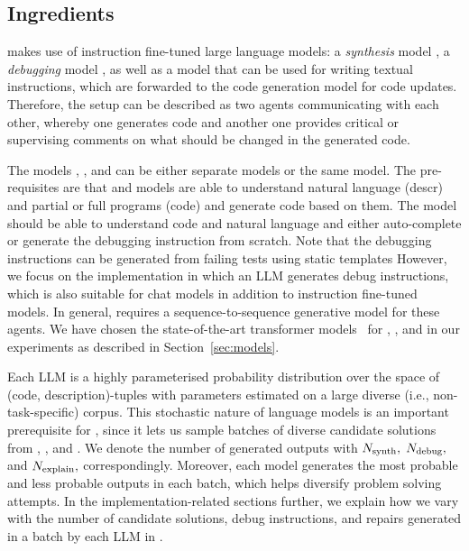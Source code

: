  

\newpage \subsection{Ingredients}
\label{sec:ingredients}

\method{} makes use of instruction fine-tuned large language models: a \emph{synthesis} model \synthmodel{}, a \emph{debugging} model \debugmodel{}, as well as a model \textmodel{} that can be used for writing textual instructions, which are forwarded to the code generation model \debugmodel{} for code updates. 
Therefore, the setup can be described as two agents communicating with each other, whereby one generates code and another one provides critical or supervising comments on what should be changed in the generated code. 

The models \synthmodel{}, \debugmodel{}, and \textmodel{} can be either separate models or the same model.
The pre-requisites are that \synthmodel{} and \debugmodel{} models are able to understand natural language (descr) and partial or full programs (code) and generate code based on them. 
The model \textmodel{} should be able to understand code and natural language and either auto-complete or generate the debugging instruction from scratch. 
Note that the debugging instructions can be generated from failing tests using static templates 
However, we focus on the implementation in which an LLM generates debug instructions, which is also suitable for chat models in addition to instruction fine-tuned models. 
In general, \method{} requires a sequence-to-sequence generative model for these agents. 
We have chosen the state-of-the-art transformer models~\cite{vaswani2017:attention} for \synthmodel{}, \debugmodel{}, and \textmodel{} in our experiments as described in Section~\ref{sec:models}. 

Each LLM is a highly parameterised probability distribution over the space of (code, description)-tuples with parameters estimated on a large diverse (i.e., non-task-specific) corpus.
This stochastic nature of language models is an important prerequisite for \method{}, since it lets us sample batches of diverse candidate solutions from \synthmodel{}, \debugmodel{}, and \textmodel{}. 
We denote the number of generated outputs with $N_\text{synth}{},$ $N_\text{debug}{},$ and $N_\text{explain}{},$ correspondingly.
Moreover, each model generates the most probable and less probable outputs in each batch, which helps diversify problem solving attempts. 
In the implementation-related sections further, we explain how we vary with the number of candidate solutions, debug instructions, and repairs generated in a batch by each LLM in \method{}.


